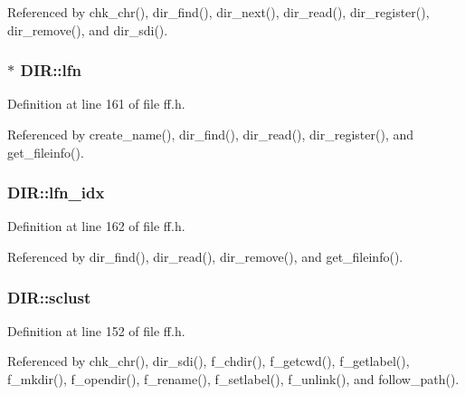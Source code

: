 Referenced by chk\+\_\+chr(), dir\+\_\+find(), dir\+\_\+next(), dir\+\_\+read(), dir\+\_\+register(), dir\+\_\+remove(), and dir\+\_\+sdi().

\subsubsection[{\texorpdfstring{lfn}{lfn}}]{$\ast$ D\+I\+R\+::lfn}\hypertarget{structDIR_af62fd789383e6f1397f74617e11c135d}{}\label{structDIR_af62fd789383e6f1397f74617e11c135d}


Definition at line 161 of file ff.\+h.



Referenced by create\+\_\+name(), dir\+\_\+find(), dir\+\_\+read(), dir\+\_\+register(), and get\+\_\+fileinfo().

\subsubsection[{\texorpdfstring{lfn\+\_\+idx}{lfn_idx}}]{ D\+I\+R\+::lfn\+\_\+idx}\hypertarget{structDIR_acad41b18758c9278c14d47076e8149fc}{}\label{structDIR_acad41b18758c9278c14d47076e8149fc}


Definition at line 162 of file ff.\+h.



Referenced by dir\+\_\+find(), dir\+\_\+read(), dir\+\_\+remove(), and get\+\_\+fileinfo().

\subsubsection[{\texorpdfstring{sclust}{sclust}}]{ D\+I\+R\+::sclust}\hypertarget{structDIR_a9212af5877b94d790dd3bab3aa320994}{}\label{structDIR_a9212af5877b94d790dd3bab3aa320994}


Definition at line 152 of file ff.\+h.



Referenced by chk\+\_\+chr(), dir\+\_\+sdi(), f\+\_\+chdir(), f\+\_\+getcwd(), f\+\_\+getlabel(), f\+\_\+mkdir(), f\+\_\+opendir(), f\+\_\+rename(), f\+\_\+setlabel(), f\+\_\+unlink(), and follow\+\_\+path().

